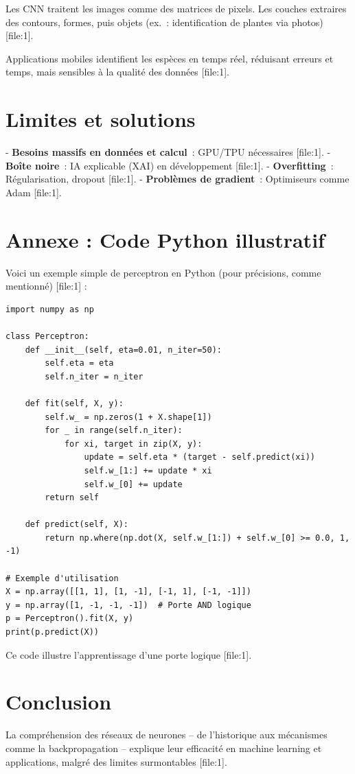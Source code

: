\documentclass[12pt,a4paper]{article}
\begin{document}
Les CNN traitent les images comme des matrices de pixels. Les couches extraires des contours, formes, puis objets (ex.~: identification de plantes via photos) [file:1]. 

Applications mobiles identifient les esp\`eces en temps r\'eel, r\'eduisant erreurs et temps, mais sensibles \`a la qualit\'e des donn\'ees [file:1].

\section{Limites et solutions}

- \textbf{Besoins massifs en donn\'ees et calcul}~: GPU/TPU n\'ecessaires [file:1].
- \textbf{Bo\^ite noire}~: IA explicable (XAI) en d\'eveloppement [file:1].
- \textbf{Overfitting}~: R\'egularisation, dropout [file:1].
- \textbf{Probl\`emes de gradient}~: Optimiseurs comme Adam [file:1].

\section{Annexe : Code Python illustratif}

Voici un exemple simple de perceptron en Python (pour pr\'ecisions, comme mentionn\'e) [file:1] :

\begin{lstlisting}
import numpy as np

class Perceptron:
    def __init__(self, eta=0.01, n_iter=50):
        self.eta = eta
        self.n_iter = n_iter
    
    def fit(self, X, y):
        self.w_ = np.zeros(1 + X.shape[1])
        for _ in range(self.n_iter):
            for xi, target in zip(X, y):
                update = self.eta * (target - self.predict(xi))
                self.w_[1:] += update * xi
                self.w_[0] += update
        return self
    
    def predict(self, X):
        return np.where(np.dot(X, self.w_[1:]) + self.w_[0] >= 0.0, 1, -1)

# Exemple d'utilisation
X = np.array([[1, 1], [1, -1], [-1, 1], [-1, -1]])
y = np.array([1, -1, -1, -1])  # Porte AND logique
p = Perceptron().fit(X, y)
print(p.predict(X))
\end{lstlisting}

Ce code illustre l'apprentissage d'une porte logique [file:1].

\section{Conclusion}

La compr\'ehension des r\'eseaux de neurones -- de l'historique aux m\'ecanismes comme la backpropagation -- explique leur efficacit\'e en machine learning et applications, malgr\'e des limites surmontables [file:1].
\end{document}

